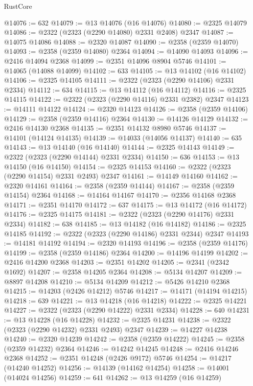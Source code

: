 \begin{lexlean}{RustCore}
\begin{coremodule}
@14076 := 632
@14079 := @13 @14076 (@16 @14076)
@14080 := @2325 @14079
@14086 := @2322 (@2323 (@2290 @14080) @2331 @2408) @2347
@14087 := @14075 @14086
@14088 := @2320 @14087
@14090 := @2358 (@2359 @14070)
@14093 := @2358 (@2359 @14080) @2364
@14094 := @14090 @14093
@14096 := @2416 @14094 @2368
@14099 := @2351 @14096 @8904 @5746
@14101 := @14065 (@14088 @14099)
@14102 := 633
@14105 := @13 @14102 (@16 @14102)
@14106 := @2325 @14105
@14111 := @2322 (@2323 (@2290 @14106) @2331 @2334)
@14112 := 634
@14115 := @13 @14112 (@16 @14112)
@14116 := @2325 @14115
@14122 := @2322 (@2323 (@2290 @14116) @2331 @2382) @2347
@14123 := @14111 @14122
@14124 := @2320 @14123
@14126 := @2358 (@2359 @14106)
@14129 := @2358 (@2359 @14116) @2364
@14130 := @14126 @14129
@14132 := @2416 @14130 @2368
@14135 := @2351 @14132 @8980 @5746
@14137 := @14101 (@14124 @14135)
@14139 := @14033 (@14056 @14137)
@14140 := 635
@14143 := @13 @14140 (@16 @14140)
@14144 := @2325 @14143
@14149 := @2322 (@2323 (@2290 @14144) @2331 @2334)
@14150 := 636
@14153 := @13 @14150 (@16 @14150)
@14154 := @2325 @14153
@14160 := @2322 (@2323 (@2290 @14154) @2331 @2493) @2347
@14161 := @14149 @14160
@14162 := @2320 @14161
@14164 := @2358 (@2359 @14144)
@14167 := @2358 (@2359 @14154) @2364
@14168 := @14164 @14167
@14170 := @2356 @14168 @2368
@14171 := @2351 @14170
@14172 := 637
@14175 := @13 @14172 (@16 @14172)
@14176 := @2325 @14175
@14181 := @2322 (@2323 (@2290 @14176) @2331 @2334)
@14182 := 638
@14185 := @13 @14182 (@16 @14182)
@14186 := @2325 @14185
@14192 := @2322 (@2323 (@2290 @14186) @2331 @2344) @2347
@14193 := @14181 @14192
@14194 := @2320 @14193
@14196 := @2358 (@2359 @14176)
@14199 := @2358 (@2359 @14186) @2364
@14200 := @14196 @14199
@14202 := @2416 @14200 @2368
@14203 := @2351 @14202
@14205 := @2341 (@2342 @1692)
@14207 := @2358 @14205 @2364
@14208 := @5134 @14207
@14209 := @8897 @14208
@14210 := @5134 @14209
@14212 := @5426 @14210 @2368
@14215 := @14203 (@2426 @14212) @5746
@14217 := @14171 (@14194 @14215)
@14218 := 639
@14221 := @13 @14218 (@16 @14218)
@14222 := @2325 @14221
@14227 := @2322 (@2323 (@2290 @14222) @2331 @2334)
@14228 := 640
@14231 := @13 @14228 (@16 @14228)
@14232 := @2325 @14231
@14238 := @2322 (@2323 (@2290 @14232) @2331 @2493) @2347
@14239 := @14227 @14238
@14240 := @2320 @14239
@14242 := @2358 (@2359 @14222)
@14245 := @2358 (@2359 @14232) @2364
@14246 := @14242 @14245
@14248 := @2416 @14246 @2368
@14252 := @2351 @14248 (@2426 @9172) @5746
@14254 := @14217 (@14240 @14252)
@14256 := @14139 (@14162 @14254)
@14258 := @14001 (@14024 @14256)
@14259 := 641
@14262 := @13 @14259 (@16 @14259)

\end{coremodule}
\end{lexlean}
